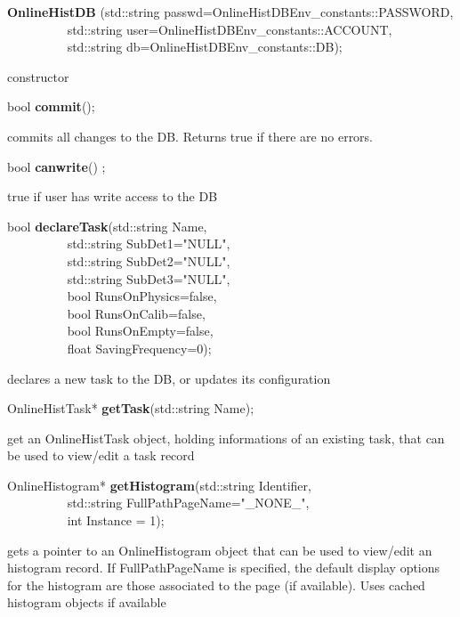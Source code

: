 \item    {\bf OnlineHistDB }(std::string passwd=OnlineHistDBEnv\_constants::PASSWORD,\\\mbox{}~~~~~~~~~ 
		std::string user=OnlineHistDBEnv\_constants::ACCOUNT,\\\mbox{}~~~~~~~~~ 
		std::string db=OnlineHistDBEnv\_constants::DB);

 constructor


\item    bool {\bf commit}();


 commits all changes to the DB. Returns true if there are no errors.


\item    bool {\bf canwrite}() ;

 true if user has write access to the DB


\item    bool {\bf declareTask}(std::string Name,\\\mbox{}~~~~~~~~~ 
		   std::string SubDet1="NULL",\\\mbox{}~~~~~~~~~ 
		   std::string SubDet2="NULL",\\\mbox{}~~~~~~~~~ 
		   std::string SubDet3="NULL",\\\mbox{}~~~~~~~~~
		   bool RunsOnPhysics=false,\\\mbox{}~~~~~~~~~ 
		   bool RunsOnCalib=false,\\\mbox{}~~~~~~~~~ 
		   bool RunsOnEmpty=false,\\\mbox{}~~~~~~~~~
		   float SavingFrequency=0);

 declares a new task to the DB, or updates its configuration 


\item    OnlineHistTask* {\bf getTask}(std::string Name);


 get an OnlineHistTask object, holding informations of an existing task, that can be used to view/edit a task record


\item    OnlineHistogram* {\bf getHistogram}(std::string Identifier,\\\mbox{}~~~~~~~~~
				std::string FullPathPageName="\_NONE\_",\\\mbox{}~~~~~~~~~
				int Instance = 1);

 gets a pointer to an OnlineHistogram object that can be used to view/edit an histogram record. If FullPathPageName
 is specified, the default display options for the histogram are those associated to the page (if available).
 Uses cached histogram objects if available


